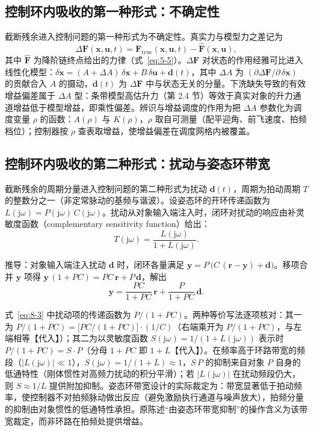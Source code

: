 \documentclass[11pt,a4paper]{ctexart}
\numberwithin{equation}{section}
\begin{document}
\subsection{控制环内吸收的第一种形式：不确定性}

截断残余进入控制问题的第一种形式为不确定性。真实力与模型力之差记为
\begin{equation}
  \Delta\bm{F}(\bm{x}, \bm{u}, t) = \bm{F}_{\text{true}}(\bm{x}, \bm{u}, t) - \hat{\bm{F}}(\bm{x}, \bm{u}), \label{eq:8-1}
\end{equation}
其中 $\hat{\bm{F}}$ 为降阶链终点给出的力律（式~\eqref{eq:5-5}）。$\Delta\bm{F}$ 对状态的作用经雅可比进入线性化模型：$\delta\dot{\bm{x}} = (A + \Delta A)\,\delta\bm{x} + B\,\delta\bm{u} + \bm{d}(t)$，其中 $\Delta A$ 为 $(\partial\Delta\bm{F}/\partial\,\delta\bm{x})$ 的贡献合入 $A$ 的摄动，$\bm{d}(t)$ 为 $\Delta\bm{F}$ 中与状态无关的分量。下洗缺失导致的有效增益偏差属于 $\Delta A$ 型：条带模型高估升力（第 2.4 节）等效于真实对象的升力通道增益低于模型增益，即乘性偏差。辨识与增益调度的作用为把 $\Delta A$ 参数化为调度变量 $\rho$ 的函数：$A(\rho)$ 与 $K(\rho)$，$\rho$ 取自可测量（配平迎角、前飞速度、拍频档位）；控制器按 $\rho$ 查表取增益，使增益偏差在调度网格内被覆盖。

\subsection{控制环内吸收的第二种形式：扰动与姿态环带宽}

截断残余的周期分量进入控制问题的第二种形式为扰动 $\bm{d}(t)$，周期为拍动周期 $T$ 的整数分之一（非定常脉动的基频与谐波）。设姿态环的开环传递函数为 $L(\mathrm{j}\omega) = P(\mathrm{j}\omega)\, C(\mathrm{j}\omega)$。扰动从对象输入端注入时，闭环对扰动的响应由补灵敏度函数（complementary sensitivity function）给出：
\begin{equation}
  T(\mathrm{j}\omega) = \frac{L(\mathrm{j}\omega)}{1 + L(\mathrm{j}\omega)}. \label{eq:8-2}
\end{equation}

推导：对象输入端注入扰动 $\bm{d}$ 时，闭环各量满足 $\bm{y} = P\,\bigl(C\,(\bm{r} - \bm{y}) + \bm{d}\bigr)$\nobreak。移项合并 $\bm{y}$ 项得 $\bm{y}\,(1 + PC) = PC\,\bm{r} + P\,\bm{d}$\nobreak，解出
\begin{equation}
  \bm{y} = \frac{PC}{1 + PC}\,\bm{r} + \frac{P}{1 + PC}\,\bm{d}. \label{eq:8-3}
\end{equation}

式~\eqref{eq:8-3} 中扰动项的传递函数为 $P/(1 + PC)$。两种等价写法逐项核对：其一为 $P/(1 + PC) = \bigl[PC/(1 + PC)\bigr]\cdot(1/C)$（右端乘开为 $P/(1 + PC)$，与左端相等【代入】）；其二为以灵敏度函数 $S(\mathrm{j}\omega) = 1/(1 + L(\mathrm{j}\omega))$ 表示时 $P/(1 + PC) = S \cdot P$（分母 $1 + PC$ 即 $1 + L$【代入】）。在频率高于环路带宽的频段（$|L(\mathrm{j}\omega)| \ll 1$），$S(\mathrm{j}\omega) = 1/(1 + L) \approx 1$，$S\, P$ 的抑制来自对象 $P$ 自身的低通特性（刚体惯性对高频力扰动的积分平滑）；若 $|L(\mathrm{j}\omega)|$ 在扰动频段仍大，则 $S \approx 1/L$ 提供附加抑制。姿态环带宽设计的实际裁定为：带宽显著低于拍动频率，使控制器不对拍频脉动做出反应（避免激励执行通道与噪声放大），拍频分量的抑制由对象惯性的低通特性承担。原陈述“由姿态环带宽抑制”的操作含义为该带宽裁定，而非环路在拍频处提供增益。
\end{document}
